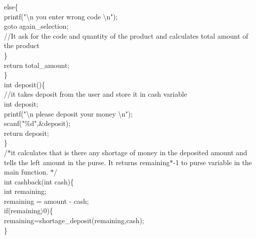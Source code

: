 \documentclass[10pt,a4paper]{article}
\begin{document}
\begin{flushleft}
    \hspace*{0.5cm}  else\{\\
    \hspace*{0.5cm}  \hspace*{0.5cm}    printf("\textbackslash n you enter wrong code \textbackslash n");\\
    \hspace*{0.5cm}  \hspace*{0.5cm}    goto again\_selection;\\  //It ask for the code and quantity of the product and calculates total amount of the product \\
    \hspace*{0.5cm}  \}\\
    \hspace*{0.5cm}  return total\_amount;\\
\}\\
int deposit()\{\\  //it takes deposit from the user and store it in cash variable\\
    \hspace*{0.5cm}  int deposit;\\
    \hspace*{0.5cm}  printf("\textbackslash n please deposit your money \textbackslash n");\\
    \hspace*{0.5cm}  scanf("\%d",\&deposit);\\
    \hspace*{0.5cm}  return deposit;\\
\}\\
/$\ast$it calculates that is there any shortage of money in the deposited amount and tells the left amount in the purse. It returns
remaining$\ast$-1 to purse variable in the main function. $\ast$/\\
int cashback(int cash)\{\\
    \hspace*{0.5cm}  int remaining;\\
    \hspace*{0.5cm}  remaining = amount - cash;\\
    \hspace*{0.5cm}  if(remaining$\rangle$0)\{\\
    \hspace*{0.5cm}  \hspace*{0.5cm}   remaining=shortage\_deposit(remaining,cash);\\
    \hspace*{0.5cm}  \hspace*{0.5cm}\}\\

\end{flushleft}
\end{document}
